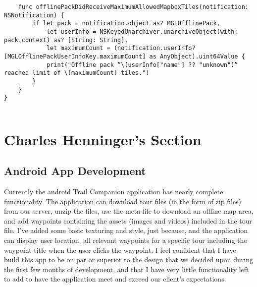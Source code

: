 \documentclass[letterpaper, 10pt,titlepage]{article}
\begin{document}
\begin{verbatim}
    func offlinePackDidReceiveMaximumAllowedMapboxTiles(notification: NSNotification) {
        if let pack = notification.object as? MGLOfflinePack,
            let userInfo = NSKeyedUnarchiver.unarchiveObject(with: pack.context) as? [String: String],
            let maximumCount = (notification.userInfo?[MGLOfflinePackUserInfoKey.maximumCount] as AnyObject).uint64Value {
            print("Offline pack “\(userInfo["name"] ?? "unknown")” reached limit of \(maximumCount) tiles.")
        }
    }
}


\end{verbatim}


\vspace{0.5cm}


\section{Charles Henninger's Section}
\subsection{Android App Development}
Currently the android Trail Companion application has nearly complete functionality. The application can download tour files (in the form of zip files) from our server, unzip the files, use the meta-file to download an offline map area, and add waypoints containing the assets (images and videos) included in the tour file. I've added some basic texturing and style, just because, and the application can display user location, all relevant waypoints for a specific tour including the waypoint title when the user clicks the waypoint. I feel confident that I have build this app to be on par or superior to the design that we decided upon during the first few months of development, and that I have very little functionality left to add to have the application meet and exceed our client's expectations.
\end{document}

